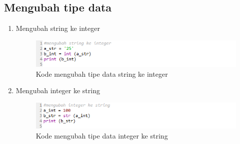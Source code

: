 \subsection{Mengubah tipe data}
\begin{enumerate}
    \item Mengubah string ke integer
        \begin{figure}[!htbp]
        \centering
        \includegraphics[width=15cm]{figures/str_int.PNG}
        \caption{Kode mengubah tipe data string ke integer}
    \end{figure}
        \item Mengubah integer ke string
        \begin{figure}[!htbp]
        \centering
        \includegraphics[width=15cm]{figures/int_str.PNG}
        \caption{Kode mengubah tipe data integer ke string}
    \end{figure}
\end{enumerate}
